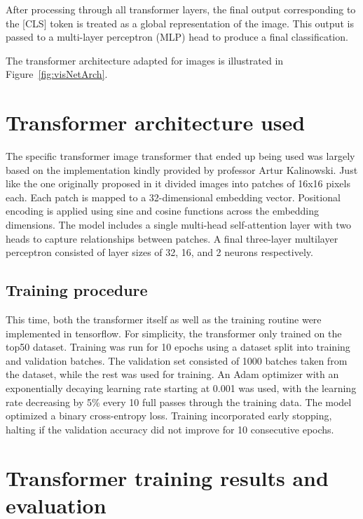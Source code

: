 \documentclass{pracalicmgr}
\begin{document}
After processing through all transformer layers, the final output corresponding to the [CLS] token is treated as a global representation of the image. This output is passed to a multi-layer perceptron (MLP) head to produce a final classification. 

The transformer architecture adapted for images is illustrated in Figure~\ref{fig:visNetArch}.

\section{Transformer architecture used}

The specific transformer image transformer that ended up being used was largely based on the implementation kindly provided by professor Artur Kalinowski. Just like the one originally proposed in \cite{ViT} it divided images into patches of 16x16 pixels each. Each patch is mapped to a 32-dimensional embedding vector. Positional encoding is applied using sine and cosine functions across the embedding dimensions. The model includes a single multi-head self-attention layer with two heads to capture relationships between patches. A final three-layer multilayer perceptron consisted of layer sizes of 32, 16, and 2 neurons respectively.

\subsection{Training procedure}

This time, both the transformer itself as well as the training routine were implemented in tensorflow. For simplicity, the transformer only trained on the top50 dataset. Training was run for 10 epochs using a dataset split into training and validation batches. The validation set consisted of 1000 batches taken from the dataset, while the rest was used for training. An Adam optimizer with an exponentially decaying learning rate starting at 0.001 was used, with the learning rate decreasing by 5\% every 10 full passes through the training data. The model optimized a binary cross-entropy loss. Training incorporated early stopping, halting if the validation accuracy did not improve for 10 consecutive epochs.

\section{Transformer training results and evaluation}
\end{document}
